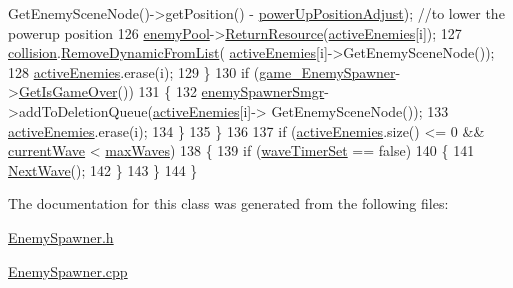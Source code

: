 \begin{DoxyCode}
      GetEnemySceneNode()->getPosition() - \hyperlink{_enemy_spawner_8cpp_ab942782e10adbde0b0cae87384eb718a}{powerUpPositionAdjust}); \textcolor{comment}{//to lower the powerup position}
126             \hyperlink{_enemy_spawner_8cpp_a10a9f0b14afa27bb442d05b6a40464d6}{enemyPool}->\hyperlink{class_enemy_pool_a23a38a606c719763861a882d9f5668e6}{ReturnResource}(\hyperlink{_enemy_spawner_8cpp_a3d9bb20c5ed03047464ed534dc3938ba}{activeEnemies}[i]);
127             \hyperlink{_enemy_spawner_8cpp_abb03345f36a95239d14eaf664bf1c8cc}{collision}.\hyperlink{class_collision_af6fe5888d934195d15e51f237fc989c6}{RemoveDynamicFromList}(
      \hyperlink{_enemy_spawner_8cpp_a3d9bb20c5ed03047464ed534dc3938ba}{activeEnemies}[i]->GetEnemySceneNode());
128             \hyperlink{_enemy_spawner_8cpp_a3d9bb20c5ed03047464ed534dc3938ba}{activeEnemies}.erase(i);
129         \}
130         \textcolor{keywordflow}{if} (\hyperlink{_enemy_spawner_8cpp_a473330ef228d901a0124176f437f5855}{game\_EnemySpawner}->\hyperlink{class_game_a472e76af50d5275142522f9a5e149ab1}{GetIsGameOver}())
131         \{
132             \hyperlink{_enemy_spawner_8cpp_acdc4e203d85a9683181751a7695ee478}{enemySpawnerSmgr}->addToDeletionQueue(\hyperlink{_enemy_spawner_8cpp_a3d9bb20c5ed03047464ed534dc3938ba}{activeEnemies}[i]->
      GetEnemySceneNode());
133             \hyperlink{_enemy_spawner_8cpp_a3d9bb20c5ed03047464ed534dc3938ba}{activeEnemies}.erase(i);
134         \}
135     \}
136 
137     \textcolor{keywordflow}{if} (\hyperlink{_enemy_spawner_8cpp_a3d9bb20c5ed03047464ed534dc3938ba}{activeEnemies}.size() <= 0 && \hyperlink{_enemy_spawner_8cpp_ae8875f134fe6fadbb9f14c149ef06d50}{currentWave} < 
      \hyperlink{_enemy_spawner_8cpp_ae7d5c9e8b2fcf54fbdaca3e3b254fde7}{maxWaves})
138     \{
139         \textcolor{keywordflow}{if} (\hyperlink{_enemy_spawner_8cpp_aa4f3458458a5f172e5b160fb68473d97}{waveTimerSet} == \textcolor{keyword}{false})
140         \{
141             \hyperlink{class_enemy_spawner_ad7105663a68f8cb931af64463f0286c8}{NextWave}();
142         \}
143     \}
144 \}
\end{DoxyCode}


The documentation for this class was generated from the following files\-:\begin{DoxyCompactItemize}
\item 
\hyperlink{_enemy_spawner_8h}{Enemy\-Spawner.\-h}\item 
\hyperlink{_enemy_spawner_8cpp}{Enemy\-Spawner.\-cpp}\end{DoxyCompactItemize}
